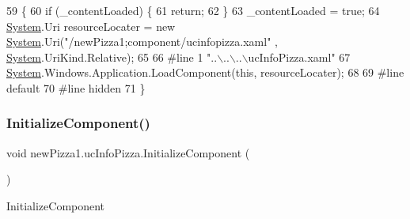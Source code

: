 \begin{DoxyCode}
59                                           \{
60             \textcolor{keywordflow}{if} (\_contentLoaded) \{
61                 \textcolor{keywordflow}{return};
62             \}
63             \_contentLoaded = \textcolor{keyword}{true};
64             \hyperlink{namespaceSystem}{System}.Uri resourceLocater = \textcolor{keyword}{new} \hyperlink{namespaceSystem}{System}.Uri(\textcolor{stringliteral}{"/newPizza1;component/ucinfopizza.xaml"}
      , \hyperlink{namespaceSystem}{System}.UriKind.Relative);
65             
66 \textcolor{preprocessor}{            #line 1 "..\(\backslash\)..\(\backslash\)..\(\backslash\)ucInfoPizza.xaml"}
67             \hyperlink{namespaceSystem}{System}.Windows.Application.LoadComponent(\textcolor{keyword}{this}, resourceLocater);
68             
69 \textcolor{preprocessor}{            #line default}
70 \textcolor{preprocessor}{            #line hidden}
71         \}
\end{DoxyCode}
\mbox{\label{classnewPizza1_1_1ucInfoPizza_a5d6e37c02a381d24941d4f45b4a21dbe}} 
\subsubsection{\texorpdfstring{Initialize\+Component()}{InitializeComponent()}\hspace{0.1cm}{\footnotesize\ttfamily [3/6]}}
{\footnotesize\ttfamily void new\+Pizza1.\+uc\+Info\+Pizza.\+Initialize\+Component (\begin{DoxyParamCaption}{ }\end{DoxyParamCaption})\hspace{0.3cm}{\ttfamily [inline]}}



Initialize\+Component 


